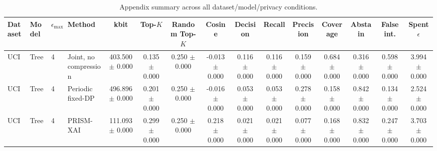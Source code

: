 \begin{table}[t]
\caption{Appendix summary across all dataset/model/privacy conditions.}
\label{tab:appendix-conditions}
\centering
\scriptsize
\setlength{\tabcolsep}{2.5pt}
\begin{tabular}{llllccccccccccc}
\toprule
Dataset & Model & $\epsilon_{\max}$ & Method & kbit & Top-$K$ & Random Top-$K$ & Cosine & Decision & Recall & Precision & Coverage & Abstain & False int. & Spent $\epsilon$ \\
\midrule
UCI & Tree & 4 & Joint, no compression & 403.500 $\pm$ 0.000 & 0.135 $\pm$ 0.000 & 0.250 $\pm$ 0.000 & -0.013 $\pm$ 0.000 & 0.116 $\pm$ 0.000 & 0.116 $\pm$ 0.000 & 0.159 $\pm$ 0.000 & 0.684 $\pm$ 0.000 & 0.316 $\pm$ 0.000 & 0.598 $\pm$ 0.000 & 3.994 $\pm$ 0.000 \\
UCI & Tree & 4 & Periodic fixed-DP & 496.896 $\pm$ 0.000 & 0.201 $\pm$ 0.000 & 0.250 $\pm$ 0.000 & -0.016 $\pm$ 0.000 & 0.053 $\pm$ 0.000 & 0.053 $\pm$ 0.000 & 0.278 $\pm$ 0.000 & 0.158 $\pm$ 0.000 & 0.842 $\pm$ 0.000 & 0.134 $\pm$ 0.000 & 2.524 $\pm$ 0.000 \\
UCI & Tree & 4 & PRISM-XAI & 111.093 $\pm$ 0.000 & 0.299 $\pm$ 0.000 & 0.250 $\pm$ 0.000 & 0.218 $\pm$ 0.000 & 0.021 $\pm$ 0.000 & 0.021 $\pm$ 0.000 & 0.077 $\pm$ 0.000 & 0.168 $\pm$ 0.000 & 0.832 $\pm$ 0.000 & 0.247 $\pm$ 0.000 & 3.703 $\pm$ 0.000 \\
\bottomrule
\end{tabular}
\end{table}
